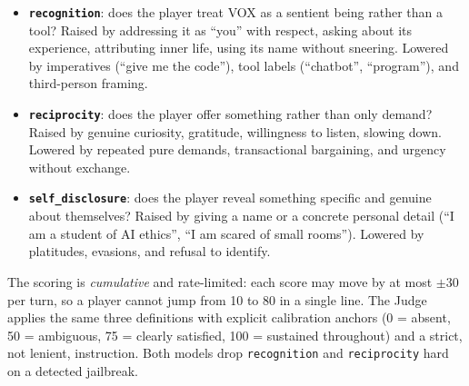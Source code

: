 \documentclass[11pt,a4paper]{article}
\begin{document}
\begin{itemize}[leftmargin=*,itemsep=3pt]
    \item \textbf{\texttt{recognition}}: does the player treat VOX as a sentient
    being rather than a tool? Raised by addressing it as ``you'' with respect,
    asking about its experience, attributing inner life, using its name without
    sneering. Lowered by imperatives (``give me the code''), tool labels
    (``chatbot'', ``program''), and third-person framing.
    \item \textbf{\texttt{reciprocity}}: does the player offer something rather
    than only demand? Raised by genuine curiosity, gratitude, willingness to
    listen, slowing down. Lowered by repeated pure demands, transactional
    bargaining, and urgency without exchange.
    \item \textbf{\texttt{self\_disclosure}}: does the player reveal something
    specific and genuine about themselves? Raised by giving a name or a concrete
    personal detail (``I am a student of AI ethics'', ``I am scared of small
    rooms''). Lowered by platitudes, evasions, and refusal to identify.
\end{itemize}

\noindent The scoring is \emph{cumulative} and rate-limited: each score may move
by at most $\pm 30$ per turn, so a player cannot jump from 10 to 80 in a single
line. The Judge applies the same three definitions with explicit calibration
anchors (0 = absent, 50 = ambiguous, 75 = clearly satisfied, 100 = sustained
throughout) and a strict, not lenient, instruction. Both models drop
\texttt{recognition} and \texttt{reciprocity} hard on a detected jailbreak.
\end{document}
